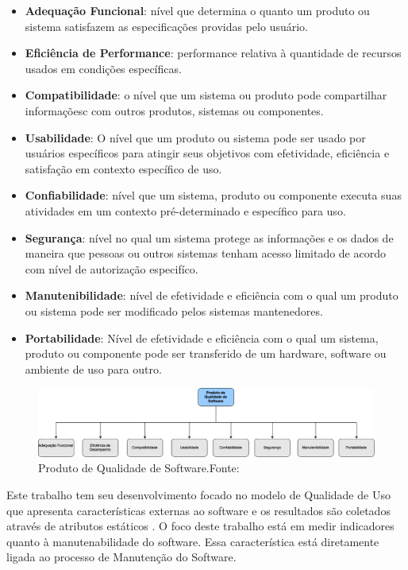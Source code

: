 \begin{itemize}
\item \textbf{Adequação Funcional}: nível que determina o quanto um produto ou sistema satisfazem as especificações providas pelo usuário.
\item \textbf{Eficiência de Performance}: performance relativa à quantidade de recursos usados em condições específicas.
\item \textbf{Compatibilidade}: o nível que um sistema ou produto pode compartilhar informaçõesc com outros produtos, sistemas ou componentes.
\item \textbf{Usabilidade}: O nível que um produto ou sistema pode ser usado por usuários específicos para atingir seus objetivos com efetividade, eficiência e satisfação em contexto específico de uso.
\item \textbf{Confiabilidade}: nível que um sistema, produto ou componente executa suas atividades em um contexto pré-determinado e específico para uso.
\item \textbf{Segurança}: nível no qual um sistema protege as informações e os dados de maneira que pessoas ou outros sistemas tenham acesso limitado de acordo com nível de autorização especifíco.
\item \textbf{Manutenibilidade}: nível de efetividade e eficiência com o qual um produto ou sistema pode ser modificado pelos sistemas mantenedores.
\item \textbf{Portabilidade}: Nível de efetividade e eficiência com o qual um sistema, produto ou componente pode ser transferido de um hardware, software ou ambiente de uso para outro.
\end{itemize}

\graphicspath{{figuras/}}
\begin{figure}
\centering
\includegraphics[scale=0.40]{SQuaRE}
\caption{Produto de Qualidade de Software.Fonte:\cite{Square}}
\label{img:modelo_square}
\end{figure}

Este trabalho tem seu desenvolvimento focado no modelo de Qualidade de Uso que apresenta características externas ao software e os resultados são coletados através de atributos estáticos \cite{Square}. O foco deste trabalho está em medir indicadores quanto à manutenabilidade do software. Essa característica está diretamente ligada ao processo de Manutenção do Software.  

